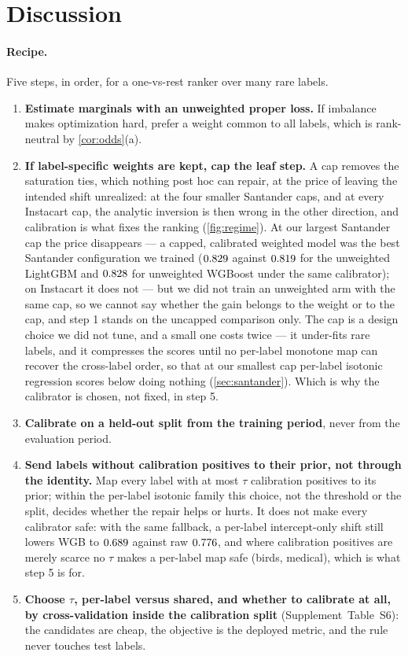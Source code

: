 \documentclass[sigconf,nonacm]{acmart}
\newcommand{\Wm}{\textsf{WGB}\xspace}
\newcommand{\Supp}[1]{Supplement~#1}  %
\begin{document}
\section{Discussion}
\label{sec:discussion}

\paragraph{Recipe.} Five steps, in order, for a one-vs-rest ranker over many rare labels.

\begin{enumerate}[leftmargin=*,nosep]
\item \textbf{Estimate marginals with an unweighted proper loss.} If imbalance makes optimization hard, prefer a weight common to all labels, which is rank-neutral by \cref{cor:odds}(a).
\item \textbf{If label-specific weights are kept, cap the leaf step.} A cap removes the saturation ties, which nothing post hoc can repair, at the price of leaving the intended shift unrealized: at the four smaller Santander caps, and at every Instacart cap, the analytic inversion is then wrong in the other direction, and calibration is what fixes the ranking (\cref{fig:regime}). At our largest Santander cap the price disappears --- a capped, calibrated weighted model was the best Santander configuration we trained ($0.829$ against $0.819$ for the unweighted LightGBM and $0.828$ for unweighted WGBoost under the same calibrator); on Instacart it does not --- but we did not train an unweighted arm with the same cap, so we cannot say whether the gain belongs to the weight or to the cap, and step 1 stands on the uncapped comparison only. The cap is a design choice we did not tune, and a small one costs twice --- it under-fits rare labels, and it compresses the scores until no per-label monotone map can recover the cross-label order, so that at our smallest cap per-label isotonic regression scores below doing nothing (\cref{sec:santander}). Which is why the calibrator is chosen, not fixed, in step 5.
\item \textbf{Calibrate on a held-out split from the training period}, never from the evaluation period.
\item \textbf{Send labels without calibration positives to their prior, not through the identity.} Map every label with at most $\tau$ calibration positives to its prior; within the per-label isotonic family this choice, not the threshold or the split, decides whether the repair helps or hurts. It does not make every calibrator safe: with the same fallback, a per-label intercept-only shift still lowers \Wm{} to $0.689$ against raw $0.776$, and where calibration positives are merely scarce no $\tau$ makes a per-label map safe (birds, medical), which is what step 5 is for.
\item \textbf{Choose $\tau$, per-label versus shared, and whether to calibrate at all, by cross-validation inside the calibration split} (\Supp{Table~S6}): the candidates are cheap, the objective is the deployed metric, and the rule never touches test labels.
\end{enumerate}
\end{document}
